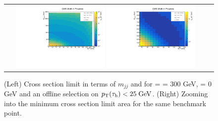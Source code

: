 \begin{figure}[tbh!]
	\centering
	\begin{tabular}{cc}
		\includegraphics[width=0.45\textwidth]{analysis/pics/JetInvMass_vs_MET_xsec_chi300_lsp000_taupt25.pdf}
		\includegraphics[width=0.45\textwidth]{analysis/pics/JetInvMass_vs_MET_xsec_chi300_lsp000_taupt25_zoom.pdf} 		
	\end{tabular}
	\caption{(Left) Cross section limit in terms of $m_{jj}$ and \met for \charginopm = \neutralinotwo = 300 GeV, \neutralinoone = 0 GeV and an offline selection on $p_{\text{T}}(\tau_{\text{h}}) <  25\;\text{Ge}\kern-0.06667em\text{V}$. (Right) Zooming into the minimum cross section limit area for the same benchmark point.}
	\label{fig::JetInvMass_vs_MET_xsec_chi300_lsp000_taupt25}
\end{figure}

